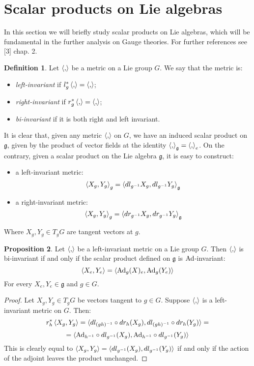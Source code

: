 \documentclass[12pt,a4paper]{report}
\theoremstyle{definition}
\newtheorem{Def}{Definition}[chapter]
\theoremstyle{Theorem}
\newtheorem{Prop}[Def]{Proposition}
\theoremstyle{definition}
\theoremstyle{definition}
\begin{document}
	\section{Scalar products on Lie algebras}
	In this section we will briefly study scalar products on Lie algebras, which will be fundamental in the further analysis on Gauge theories. For further references see [3] chap. 2.
	\begin{Def}
		Let $\braket{,}$ be a metric on a Lie group $G$. We say that the metric is:
		\begin{itemize}
			\item \textit{left-invariant} if $l^*_g\braket{,}=\braket{,}$;
			\item \textit{right-invariant} if $r^*_g\braket{,}=\braket{,}$;
			\item \textit{bi-invariant} if it is both right and left invariant.
		\end{itemize}
	\end{Def}
	It is clear that, given any metric $\braket{,}$ on $G$, we have an induced scalar product on $\mathfrak{g}$, given by the product of vector fields at the identity $\braket{,}_\mathfrak{g}=\braket{,}_e$. On the contrary, given a scalar product on the Lie algebra $\mathfrak{g}$, it is easy to construct:
	\begin{itemize}
		\item a left-invariant metric:
		$$\braket{X_g,Y_g}_g=\braket{dl_{g^{-1}}X_g,dl_{g^{-1}}Y_g}_\mathfrak{g}$$
		\item a right-invariant metric:
		$$\braket{X_g,Y_g}_g=\braket{dr_{g^{-1}}X_g,dr_{g^{-1}}Y_g}_\mathfrak{g}$$
	\end{itemize}
	Where $X_g,Y_g\in T_gG$ are tangent vectors at $g$.
	\begin{Prop}
		Let $\braket{,}$ be a left-invariant metric on a Lie group $G$. Then $\braket{,}$ is bi-invariant if and only if the scalar product defined on $\mathfrak{g}$ is $\hbox{Ad}$-invariant:
		$$\braket{X_e,Y_e}=\braket{\hbox{Ad}_g(X)_e,\hbox{Ad}_g(Y_e)}$$
		For every $X_e,Y_e\in\mathfrak{g}$ and $g\in G$.
	\end{Prop}
	\begin{proof}
		Let $X_g,Y_g\in T_gG$ be vectors tangent to $g\in G$. Suppose $\braket{,}$ is a left-invariant metric on $G$. Then:
		$$r_h^*\braket{X_g,Y_g}=\braket{dl_{(gh)^{-1}}\circ dr_h(X_g),dl_{(gh)^{-1}}\circ dr_h(Y_g)}=$$
		$$=\braket{\hbox{Ad}_{h^{-1}}\circ dl_{g^{-1}}(X_g),\hbox{Ad}_{h^{-1}}\circ dl_{g^{-1}}(Y_g)}$$
		This is clearly equal to $\braket{X_g,Y_g}=\braket{dl_{g^{-1}}(X_g),dl_{g^{-1}}(Y_g)}$ if and only if the action of the adjoint leaves the product unchanged.
	\end{proof}
\end{document}
